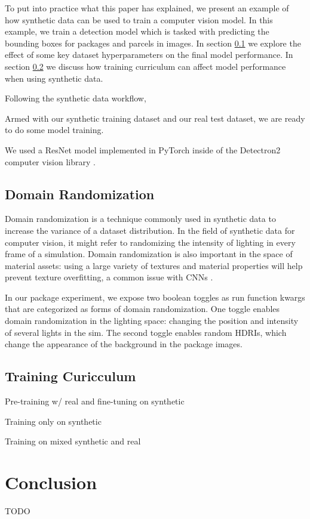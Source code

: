 \documentclass{article}
\begin{document}
To put into practice what this paper has explained, we present an example of how synthetic data can be used to train a computer vision model. In this example, we train a detection model which is tasked with predicting the bounding boxes for packages and parcels in images. In section \ref{sec:domainrandomization} we explore the effect of some key dataset hyperparameters on the final model performance. In section \ref{sec:curicculum} we discuss how training curriculum can affect model performance when using synthetic data.

Following the synthetic data workflow,

Armed with our synthetic training dataset and our real test dataset, we are ready to do some model training.

We used a ResNet model implemented in PyTorch inside of the Detectron2 computer vision library \citep{wu2019detectron2}.


\subsection{Domain Randomization}
\label{sec:domainrandomization}

Domain randomization is a technique commonly used in synthetic data to increase the variance of a dataset distribution. In the field of synthetic data for computer vision, it might refer to randomizing the intensity of lighting in every frame of a simulation. Domain randomization is also important in the space of material assets: using a large variety of textures and material properties will help prevent texture overfitting, a common issue with CNNs \citep{DBLP:journals/corr/abs-1811-12231}. 

In our package experiment, we expose two boolean toggles as run function kwargs that are categorized as forms of domain randomization. One toggle enables domain randomization in the lighting space: changing the position and intensity of several lights in the sim. The second toggle enables random HDRIs, which change the appearance of the background in the package images.

\subsection{Training Curicculum}
\label{sec:curicculum}

Pre-training w/ real and fine-tuning on synthetic

Training only on synthetic

Training on mixed synthetic and real

\section{Conclusion}
\label{sec:conclusion}

TODO



\end{document}
